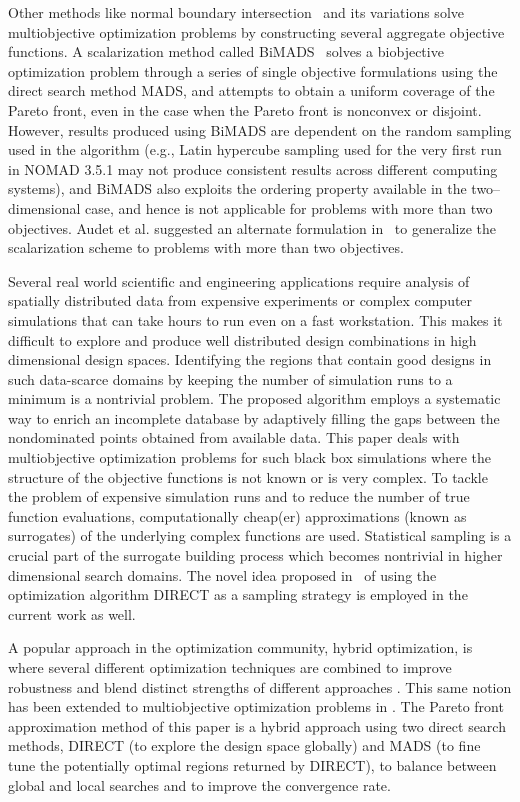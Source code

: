Other methods like normal boundary intersection \DD\ and its variations solve
multiobjective optimization problems by constructing several aggregate
objective functions. A scalarization method called BiMADS \ASZ\ solves a
biobjective optimization problem through a series of single objective
formulations using the direct search method MADS, and attempts to obtain a
uniform coverage of the Pareto front, even in the case when the Pareto front is
nonconvex or disjoint. However, results produced using BiMADS are dependent on
the random sampling used in the algorithm (e.g., Latin hypercube sampling used
for the very first run in NOMAD 3.5.1 may not produce consistent results across
different computing systems), and BiMADS also exploits the ordering property
available in the two--dimensional case, and hence is not applicable for
problems with more than two objectives. Audet et al. suggested an alternate
formulation in \ASZ\ to generalize the scalarization scheme to problems with
more than two objectives. 

Several real world scientific and engineering applications require analysis of
spatially distributed data from expensive experiments or complex computer
simulations that can take hours to run even on a fast workstation. This makes
it difficult to explore and produce well distributed design combinations in
high dimensional design spaces. Identifying the regions that contain good
designs in such data-scarce domains by keeping the number of simulation runs to
a minimum is a nontrivial problem. The proposed algorithm employs a systematic
way to enrich an incomplete database by adaptively filling the gaps between the
nondominated points obtained from available data.  This paper deals with
multiobjective optimization problems for such black box simulations where the
structure of the objective functions is not known or is very complex. To tackle
the problem of expensive simulation runs and to reduce the number of true
function evaluations, computationally cheap(er) approximations (known as
surrogates) of the underlying complex functions are used. Statistical sampling
is a crucial part of the surrogate building process which becomes nontrivial in
higher dimensional search domains. The novel idea proposed in \DWC\ of using
the optimization algorithm DIRECT as a sampling strategy is employed in the
current work as well. 

A popular approach in the optimization community, hybrid optimization, is where
several different optimization techniques are combined to improve robustness
and blend distinct strengths of different approaches \GF. This same notion has
been extended to multiobjective optimization problems in \WIHM.  The Pareto
front approximation method of this paper is a hybrid approach using two direct
search methods, DIRECT (to explore the design space globally) and MADS (to fine
tune the potentially optimal regions returned by DIRECT), to balance between
global and local searches and to improve the convergence rate.

